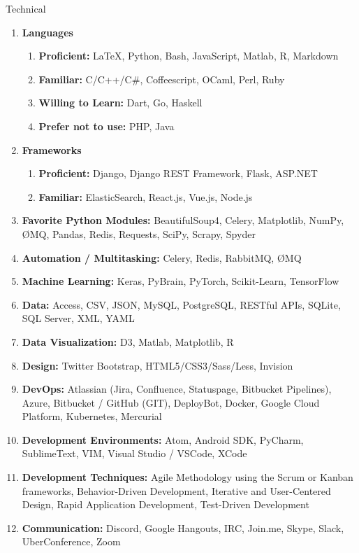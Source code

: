 \documentclass[oneside]{article}%
\begin{document}
\noindent
\huge{Technical}
\small
\begin{enumerate}[]
	\item \textbf{Languages}
		\begin{enumerate}[*]
			 \item \textbf{Proficient:} \LaTeX, Python, Bash, JavaScript, Matlab, R, Markdown
			 \item \textbf{Familiar:} C/C++/C\#, Coffeescript, OCaml, Perl, Ruby
			 \item \textbf{Willing to Learn:} Dart, Go, Haskell
			 \item \textbf{Prefer not to use:} PHP, Java
		\end{enumerate}
	\item \textbf{Frameworks}
		\begin{enumerate}[*]
			 \item \textbf{Proficient:} Django, Django REST Framework, Flask, ASP.NET
			 \item \textbf{Familiar:} ElasticSearch, React.js, Vue.js, Node.js
		\end{enumerate}
	\item \textbf{Favorite Python Modules:} BeautifulSoup4, Celery, Matplotlib, NumPy, ØMQ, Pandas, Redis, Requests, SciPy, Scrapy, Spyder
	\item \textbf{Automation / Multitasking:} Celery, Redis, RabbitMQ, ØMQ
	\item \textbf{Machine Learning:} Keras, PyBrain, PyTorch, Scikit-Learn, TensorFlow
	\item \textbf{Data:} Access, CSV, JSON, MySQL, PostgreSQL, RESTful APIs, SQLite, SQL Server, XML, YAML
	\item \textbf{Data Visualization:} D3, Matlab, Matplotlib, R
	\item \textbf{Design:} Twitter Bootstrap, HTML5/CSS3/Sass/Less, Invision
	\item \textbf{DevOps:} Atlassian (Jira, Confluence, Statuspage, Bitbucket Pipelines), Azure, Bitbucket / GitHub (GIT), DeployBot, Docker, Google Cloud Platform, Kubernetes, Mercurial
	\item \textbf{Development Environments:} Atom, Android SDK, PyCharm, SublimeText, VIM, Visual Studio / VSCode, XCode
	\item \textbf{Development Techniques:} Agile Methodology using the Scrum or Kanban frameworks, Behavior-Driven Development, Iterative and User-Centered Design, Rapid Application Development, Test-Driven Development
	\item \textbf{Communication:} Discord, Google Hangouts, IRC, Join.me, Skype, Slack, UberConference, Zoom

\end{enumerate}
\end{document}
